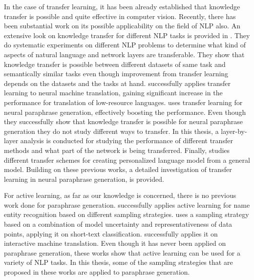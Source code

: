 In the case of transfer learning, it has been already established that knowledge transfer is possible and quite effective in computer vision. Recently, there has been substantial work on its possible applicability on the field of NLP also. An extensive look on knowledge transfer for different NLP tasks is provided in \cite{mou}. They do systematic experiments on different NLP problems to determine what kind of aspects of natural language and network layers are transferable. They show that knowledge transfer is possible between different datasets of same task and semantically similar tasks even though improvement from transfer learning depends on the datasets and the tasks at hand. \cite{zoph} successfully applies transfer learning to neural machine translation, gaining significant increase in the performance for translation of low-resource languages. \cite{brad} uses transfer learning for neural paraphrase generation, effectively boosting the performance. Even though they successfully show that knowledge transfer is possible for neural paraphrase generation they do not study different ways to transfer. In this thesis, a layer-by-layer analysis is conducted for studying the performance of different transfer methods and what part of the network is being transferred. Finally, \cite{yoon} studies different transfer schemes for creating personalized language model from a general model. Building on these previous works, a detailed investigation of transfer learning in neural paraphrase generation, is provided.

For active learning, as far as our knowledge is concerned, there is no previous work done for paraphrase generation. \cite{shen} successfully applies active learning for name entity recognition based on different sampling strategies. \cite{zhao} uses a sampling strategy based on a combination of model uncertainty and representativeness of data points, applying it on short-text classification. \cite{rubio} successfully applies it on interactive machine translation. Even though it has never been applied on paraphrase generation, these works show that active learning can be used for a variety of NLP tasks. In this thesis, some of the sampling strategies that are proposed in these works are applied to paraphrase generation.